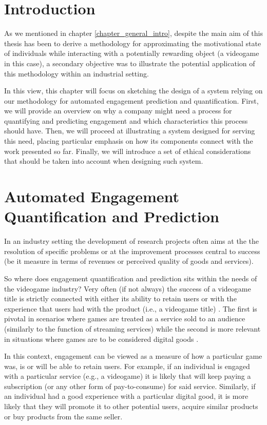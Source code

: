 \section{Introduction}
As we mentioned in chapter \ref{chapter_general_intro}, despite the main aim of this thesis has been to derive a methodology for approximating the motivational state of individuals while interacting with a potentially rewarding object (a videogame in this case), a secondary objective was to illustrate the potential application of this methodology within an industrial setting. 

In this view, this chapter will focus on sketching the design of a system relying on our methodology for automated engagement prediction and quantification. First, we will provide an overview on why a company might need a process for quantifying and predicting engagement and which characteristics this process should have. Then, we will proceed at illustrating a system designed for serving this need, placing particular emphasis on how its components connect with the work presented so far. Finally, we will introduce a set of ethical considerations that should be taken into account when designing such system.

\section{Automated Engagement Quantification and Prediction}
\label{industry_needs}
In an industry setting the development of research projects often aims at the the resolution of specific problems or at the improvement processes central to success (be it measure in terms of revenues or perceived quality of goods and services). 

So where does engagement quantification and prediction sits within the needs of the videogame industry? Very often (if not always) the success of a videogame title is strictly connected with either its ability to retain users or with the experience that users had with the product (i.e., a videogame title) \cite{amit2001value, alomari2016mobile}. The first is pivotal in scenarios where games are treated as a service sold to an audience (similarly to the function of streaming services) while the second is more relevant in situations where games are to be considered digital goods \cite{amit2001value, alomari2016mobile}. 

In this context, engagement can be viewed as a measure of how a particular game was, is or will be able to retain users. For example, if an individual is engaged with a particular service (e.g., a videogame) it is likely that will keep paying a subscription (or any other form of pay-to-consume) for said service. Similarly, if an individual had a good experience with a particular digital good, it is more likely that they will promote it to other potential users, acquire similar products or buy products from the same seller.  

